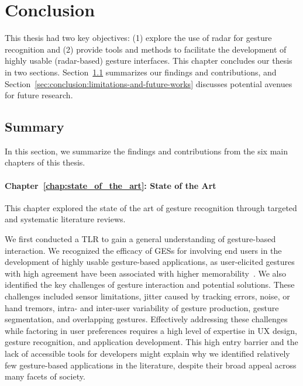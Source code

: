 \chapter{Conclusion}
\label{chap:conclusion}
This thesis had two key objectives: (1) {explore the use of radar for gesture recognition} and (2) {provide tools and methods to facilitate the development of highly usable (radar-based) gesture interfaces}.
%
This chapter concludes our thesis in two sections.
Section~\ref{sec:conclusion:summary} summarizes our findings and contributions, and Section~\ref{sec:conclusion:limitations-and-future-works} discusses potential avenues for future research.


\section{Summary}
\label{sec:conclusion:summary}
In this section, we summarize the findings and contributions from the six main chapters of this thesis.

\subsubsection{Chapter~\ref{chap:state_of_the_art}: State of the Art}
This chapter explored the state of the art of gesture recognition through targeted and systematic literature reviews.

We first conducted a TLR to gain a general understanding of gesture-based interaction. 
%
We recognized the efficacy of GESs for involving end users in the development of highly usable gesture-based applications, as user-elicited gestures with high agreement have been associated with higher memorability~\cite{Vatavu:2014b}.
%
We also identified the key challenges of gesture interaction and potential solutions. These challenges included sensor limitations, jitter caused by tracking errors, noise, or hand tremors, intra- and inter-user variability of gesture production, gesture segmentation, and overlapping gestures. Effectively addressing these challenges while factoring in user preferences requires a high level of expertise in UX design, gesture recognition, and application development.
%
This high entry barrier and the lack of accessible tools for developers might explain why we identified relatively few gesture-based applications in the literature, despite their broad appeal across many facets of society. 

